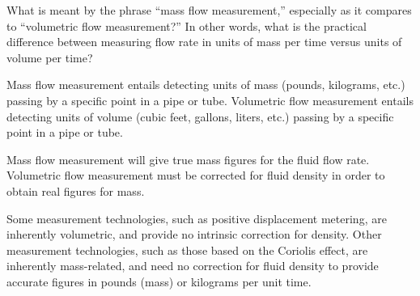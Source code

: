 

What is meant by the phrase ``mass flow measurement,'' especially as it compares to ``volumetric flow measurement?''  In other words, what is the practical difference between measuring flow rate in units of mass per time versus units of volume per time?







Mass flow measurement entails detecting units of mass (pounds, kilograms, etc.) passing by a specific point in a pipe or tube.  Volumetric flow measurement entails detecting units of volume (cubic feet, gallons, liters, etc.) passing by a specific point in a pipe or tube.

Mass flow measurement will give true mass figures for the fluid flow rate.  Volumetric flow measurement must be corrected for fluid density in order to obtain real figures for mass.







Some measurement technologies, such as positive displacement metering, are inherently volumetric, and provide no intrinsic correction for density.  Other measurement technologies, such as those based on the Coriolis effect, are inherently mass-related, and need no correction for fluid density to provide accurate figures in pounds (mass) or kilograms per unit time.




